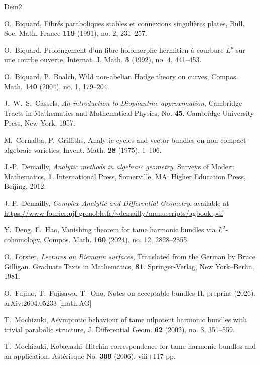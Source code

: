 \documentclass[12pt,twoside]{amsart}
\theoremstyle{definition}
\begin{document}
\begin{thebibliography}{Dem2} 

O.~Biquard, Fibr\'es paraboliques stables 
et connexions singuli\`eres plates, 
Bull. Soc. Math. France \textbf{119} (1991), no. 2, 231--257. 

O.~Biquard, Prolongement d'un fibre holomorphe hermitien \`a courbure $L^p$ 
sur une courbe ouverte, Internat. J. Math. \textbf{3} (1992), no. 4, 441--453. 

O.~Biquard, P.~Boalch, 
Wild non-abelian Hodge theory on curves, Compos. Math. \textbf{140} (2004), 
no. 1, 179--204. 
 
J.~W.~S.~Cassels, {\em{An introduction to Diophantine approximation}}, 
Cambridge Tracts in Mathematics and Mathematical Physics, 
No. \textbf{45}. Cambridge University Press, New York, 1957.

M.~Cornalba, P.~Griffiths, 
Analytic cycles and vector bundles on non-compact 
algebraic varieties, Invent. Math. \textbf{28} (1975), 1--106. 

J.-P.~Demailly, {\em{Analytic methods in algebraic geometry}}, 
Surveys of Modern Mathematics, \textbf{1}. International 
Press, Somerville, MA; Higher Education Press, Beijing, 2012.

J.-P.~Demailly, {\em{Complex Analytic and Differential Geometry}}, 
available 
at \url{https://www-fourier.ujf-grenoble.fr/~demailly/manuscripts/agbook.pdf}

Y.~Deng, F.~Hao, Vanishing theorem for 
tame harmonic bundles via $L^2$-cohomology, 
Compos. Math. \textbf{160} (2024), no. 12, 2828--2855.

O.~Forster, {\em{Lectures on Riemann surfaces}}, Translated from 
the German by Bruce Gilligan. Graduate 
Texts in Mathematics, \textbf{81}. Springer-Verlag, New 
York--Berlin, 1981.

O.~Fujino, T.~Fujisawa, T.~Ono, Notes on 
acceptable bundles II, 
preprint (2026). arXiv:2604.05233 [math.AG] 

T.~Mochizuki, 
Asymptotic behaviour of tame 
nilpotent harmonic bundles with trivial 
parabolic structure, 
J. Differential Geom. \textbf{62} (2002), no. 3, 351--559. 

T.~Mochizuki, 
Kobayashi--Hitchin correspondence 
for tame harmonic bundles and an application, 
Ast\'erisque No. \textbf{309} (2006), viii+117 pp. 


\end{thebibliography}
\end{document}
